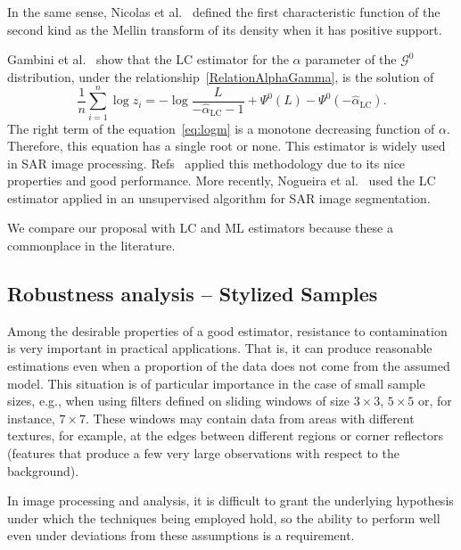 \documentclass[twocolumn]{svjour3}
\begin{document}
	In the same sense, Nicolas et al.~\cite{nicolas2002} defined the first characteristic function of the second kind as the Mellin transform of its density when it has positive support. 
	
	Gambini et al.~\cite{gambini2015} show that the LC estimator for the $\alpha$ parameter of the $\mathcal{G}^0$ distribution, under the relationship~\eqref{RelationAlphaGamma}, is the solution of 
	\begin{equation} \label{eq:logm}
		\frac{1}{n} \sum_{i=1}^n\log z_i =   -\log \frac{L}{-\widehat\alpha_{\text{{LC}}}-1} + \Psi^0(L) - \Psi^0(-\widehat\alpha_{\text{{LC}}}).
	\end{equation}
	The right term of the equation~\eqref{eq:logm} is a monotone decreasing function of $\alpha$. Therefore, this equation has a single root or none. 
	This estimator is widely used in SAR image processing. 
	Refs~\cite{MellinAnalysisPolSAR,BujorTrouveValetNicolas2004,khan2014} applied this methodology due to its nice properties and good performance. 
	More recently, Nogueira et al.~\cite{Nogueira2019} used the LC estimator applied in an unsupervised algorithm for SAR image segmentation.
	
	We compare our proposal with LC and ML estimators because these a commonplace in the literature.
	
	\subsection{Robustness analysis -- Stylized Samples}
	\label{robustez}
	Among the desirable properties of a good estimator, resistance to contamination is very important in practical applications. 
	That is, it can produce reasonable estimations even when a proportion of the data does not come from the assumed model. 
	This situation is of particular importance in the case of small sample sizes, e.g., when using filters defined on sliding windows of size $3 \times 3$, $5 \times 5$ or, for instance, $7 \times 7$. 
	These windows may contain data from areas with different textures, for example, at the edges between different regions or corner reflectors (features that produce a few very large observations with respect to the background).
	
	In image processing and analysis, it is difficult to grant the underlying hypothesis under which the techniques being employed hold, so the ability to perform well even under deviations from these assumptions is a requirement.
	
\end{document}
